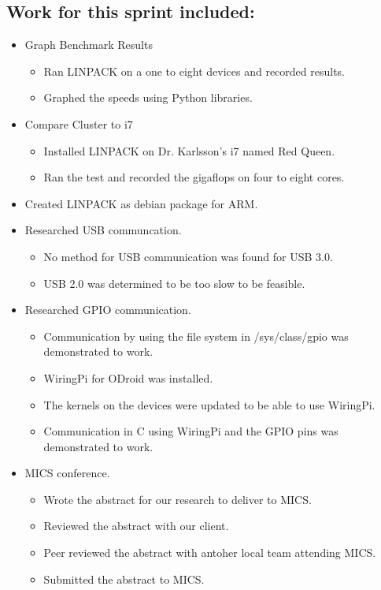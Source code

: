 \documentclass{article}
\begin{document}
\subsection*{Work for this sprint included:}
\begin{itemize}
	\item Graph Benchmark Results
	\begin{itemize}
		\item Ran LINPACK on a one to eight devices and recorded results.
		\item Graphed the speeds using Python libraries.
	\end{itemize}
	\item Compare Cluster to i7
	\begin{itemize}
		\item Installed LINPACK on Dr. Karlsson's i7 named Red Queen.
		\item Ran the test and recorded the gigaflops on four to eight cores.
	\end{itemize}
	\item Created LINPACK as debian package for ARM.
	\item Researched USB communcation.
	\begin{itemize}
		\item No method for USB communication was found for USB 3.0.
		\item USB 2.0 was determined to be too slow to be feasible.
	\end{itemize}
	\item Researched GPIO communication.
	\begin{itemize}
		\item Communication by using the file system in /sys/class/gpio was demonstrated to work.
		\item WiringPi for ODroid was installed.
		\item The kernels on the devices were updated to be able to use WiringPi.
		\item Communication in C using WiringPi and the GPIO pins was demonstrated to work.
	\end{itemize} 
	\item MICS conference.
	\begin{itemize}
		\item Wrote the abstract for our research to deliver to MICS.
		\item Reviewed the abstract with our client.
		\item Peer reviewed the abstract with antoher local team attending MICS.
		\item Submitted the abstract to MICS.
	\end{itemize}
\end{itemize}
\end{document}
